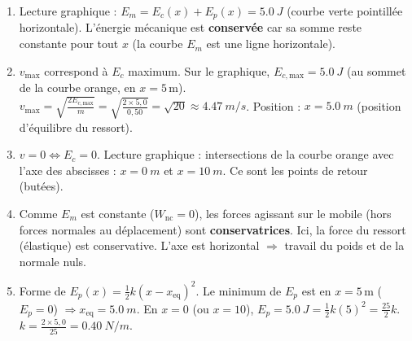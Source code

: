 \documentclass[11pt]{article}
\begin{document}
\begin{corrige}
\begin{enumerate}
    \item Lecture graphique : $E_m = E_c(x) + E_p(x) = \SI{5,0}{J}$ (courbe verte pointillée horizontale). L'énergie mécanique est \textbf{conservée} car sa somme reste constante pour tout $x$ (la courbe $E_m$ est une ligne horizontale).
    \item $v_{\text{max}}$ correspond à $E_c$ maximum. Sur le graphique, $E_{c,\text{max}} = \SI{5,0}{J}$ (au sommet de la courbe orange, en $x=5\,\text{m}$).
    $v_{\text{max}} = \sqrt{\frac{2E_{c,\text{max}}}{m}} = \sqrt{\frac{2 \times 5,0}{0,50}} = \sqrt{20} \approx \SI{4,47}{m/s}$.
    Position : $x = \SI{5,0}{m}$ (position d'équilibre du ressort).
    \item $v=0 \Leftrightarrow E_c=0$. Lecture graphique : intersections de la courbe orange avec l'axe des abscisses : $x = \SI{0}{m}$ et $x = \SI{10}{m}$. Ce sont les points de retour (butées).
    \item Comme $E_m$ est constante ($W_{\text{nc}}=0$), les forces agissant sur le mobile (hors forces normales au déplacement) sont \textbf{conservatrices}. Ici, la force du ressort (élastique) est conservative. L'axe est horizontal $\Rightarrow$ travail du poids et de la normale nuls.
    \item Forme de $E_p(x) = \frac{1}{2}k(x-x_{\text{eq}})^2$.
    Le minimum de $E_p$ est en $x=5\,\text{m}$ ($E_p=0$) $\Rightarrow x_{\text{eq}} = \SI{5,0}{m}$.
    En $x=0$ (ou $x=10$), $E_p = \SI{5,0}{J} = \frac{1}{2}k(5)^2 = \frac{25}{2}k$.
    $k = \frac{2 \times 5,0}{25} = \SI{0,40}{N/m}$.
\end{enumerate}
\end{corrige}
\end{document}
